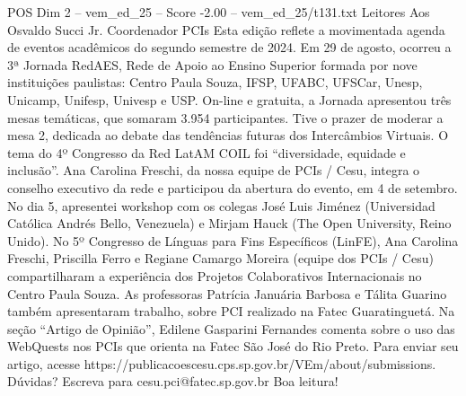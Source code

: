\begin{textsample}{POS Dim 2 – vem\_ed\_25 – Score -2.00 – vem\_ed\_25/t131.txt}  \label{ex:f2_pos_057}
Leitores Aos Osvaldo Succi Jr.
Coordenador PCIs Esta edição reflete a movimentada agenda de eventos acadêmicos do segundo semestre de 2024.
Em 29 de agosto, ocorreu a 3ª Jornada RedAES, Rede de Apoio ao Ensino Superior formada por nove instituições paulistas: Centro Paula Souza, IFSP, UFABC, UFSCar, Unesp, Unicamp, Unifesp, Univesp e USP.
On-line e gratuita, a Jornada apresentou três mesas temáticas, que somaram 3.954 participantes.
Tive o prazer de moderar a mesa 2, dedicada ao debate das tendências futuras dos Intercâmbios Virtuais.
O tema do 4º Congresso da Red LatAM COIL foi “diversidade, equidade e inclusão”.
Ana Carolina Freschi, da nossa equipe de PCIs / Cesu, integra o conselho executivo da rede e participou da abertura do evento, em 4 de setembro.
No dia 5, apresentei workshop com os colegas José Luis Jiménez (Universidad Católica Andrés Bello, Venezuela) e Mirjam Hauck (The Open University, Reino Unido).
No 5º Congresso de Línguas para Fins Específicos (LinFE), Ana Carolina Freschi, Priscilla Ferro e Regiane Camargo Moreira (equipe dos PCIs / Cesu) compartilharam a experiência dos Projetos Colaborativos Internacionais no Centro Paula Souza.
As professoras Patrícia Januária Barbosa e Tálita Guarino também apresentaram trabalho, sobre PCI realizado na Fatec Guaratinguetá.
Na seção “Artigo de Opinião”, Edilene Gasparini Fernandes comenta sobre o uso das WebQuests nos PCIs que orienta na Fatec São José do Rio Preto.
Para enviar seu artigo, acesse https://publicacoescesu.cps.sp.gov.br/VEm/about/submissions.
Dúvidas?
Escreva para cesu.pci@fatec.sp.gov.br Boa leitura!

\end{textsample}
